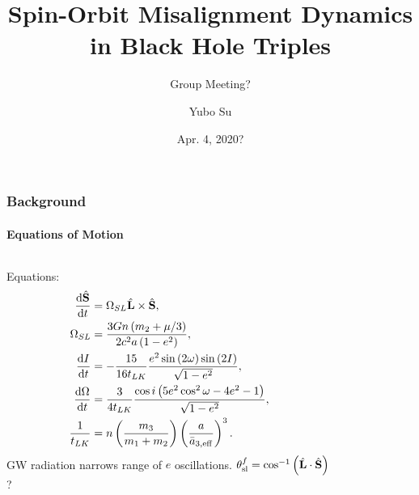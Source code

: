 \documentclass[dvipsnames, 8pt]{beamer}
\newcommand*{\rd}[2]{\frac{\mathrm{d}#1}{\mathrm{d}#2}}
\newcommand*{\bm}[1]{\boldsymbol{\mathbf{#1}}}
\newcommand*{\uv}[1]{\hat{\bm{#1}}}
\newcommand*{\p}[1]{\left(#1\right)}
\begin{document}
\title{Spin-Orbit Misalignment Dynamics in Black Hole Triples}
\subtitle{Group Meeting?}
\author{Yubo Su}
\date{Apr. 4, 2020?}

\maketitle

\begin{frame}
    \frametitle{Background}
    \framesubtitle{Equations of Motion}

    \begin{columns}
        \begin{column}{0.5\textwidth}
            Equations:
            \begin{align}
                \rd{\uv{S}}{t} &= \Omega_{SL} \uv{L} \times \uv{S},\\
                \Omega_{SL} &= \frac{3Gn\p{m_2 + \mu/3}}{2c^2a\p{1 - e^2}},\\
                \rd{I}{t} &= -\frac{15}{16t_{LK}}\frac{e^2\sin\p{2\omega}
                    \sin \p{2I}}{\sqrt{1 - e^2}},\\
                \rd{\Omega}{t} &= \frac{3}{4t_{LK}}
                    \frac{\cos i\p{5e^2\cos^2\omega - 4e^2 - 1}}{\sqrt{1 - e^2}}
                    ,\\
                \frac{1}{t_{LK}} &= n\p{\frac{m_3}{m_1 + m_2}}
                    \p{\frac{a}{\bar{a}_{3, \rm eff}}}^3.
            \end{align}
            GW radiation narrows range of $e$ oscillations. $\theta_{\rm sl}^f =
            \cos^{-1} \p{\uv{L} \cdot \uv{S}}$?
        \end{column}
        \begin{column}{0.5\textwidth}
            \begin{figure}
                \centering
            \end{figure}
        \end{column}
    \end{columns}
\end{frame}
\end{document}
